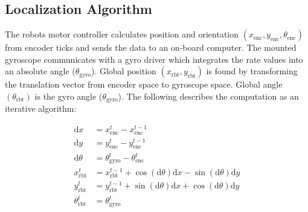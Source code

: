 \documentclass{article}
\begin{document}
\subsection{Localization Algorithm}
The robots motor controller calculates position and orientation $(x_{\mathrm{enc}}, y_{\mathrm{enc}}, \theta_{\mathrm{enc}})$ from encoder ticks and sends the data to an on-board computer. The mounted gyroscope communicates with a gyro driver which integrates the rate values into an absolute angle ($\theta_{\mathrm{gyro}}$). Global position $(x_{\mathrm{rbt}}, y_{\mathrm{rbt}})$ is found by transforming the translation vector from encoder space to gyroscope space. Global angle $(\theta_{\mathrm{rbt}})$ is the gyro angle ($\theta_{\mathrm{gyro}}$). The following describes the computation as an iterative algorithm: 
\begin{center}
\begin{align}
\mathrm{d}x&=x^{t}_{\mathrm{enc}}-x^{t-1}_{\mathrm{enc}} \\
\mathrm{d}y&=y^{t}_{\mathrm{enc}}-y^{t-1}_{\mathrm{enc}} \\
\mathrm{d}\theta&=\theta^t_{\mathrm{gyro}}-\theta^{t}_{\mathrm{enc}} \\
x^t_{\mathrm{rbt}}&=x^{t-1}_{\mathrm{rbt}}+\cos(\mathrm{d}\theta)\mathrm{d}x-\sin(\mathrm{d}\theta)\mathrm{d}y \\
y^t_{\mathrm{rbt}}&=y^{t-1}_{\mathrm{rbt}}+\sin(\mathrm{d}\theta)\mathrm{d}x+\cos(\mathrm{d}\theta)\mathrm{d}y \\
\theta^t_{\mathrm{rbt}}&=\theta^t_{\mathrm{gyro}}
\end{align}
\end{center}
\end{document}
